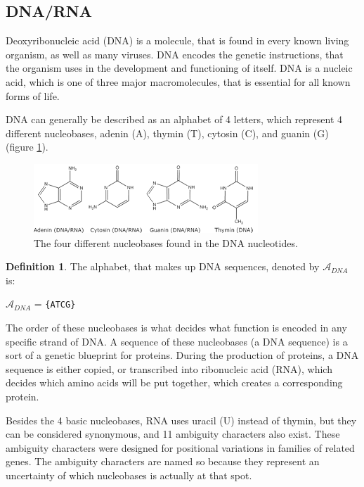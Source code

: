 \documentclass[12pt]{article}
\theoremstyle{definition}
\newtheorem{mydef}{Definition}
\begin{document}
\subsection{DNA/RNA}

Deoxyribonucleic acid (DNA) is a molecule, that is found in every known living organism, as well as many viruses. DNA encodes the genetic instructions, that the organism uses in the development and functioning of itself. DNA is a nucleic acid, which is one of three major macromolecules, that is essential for all known forms of life.

DNA can generally be described as an alphabet of 4 letters, which represent 4 different nucleobases, adenin (A), thymin (T), cytosin (C), and guanin (G) (figure \ref{dnabases}).

\begin{figure}[H]
\label{dnabases}
\begin{center}
	\includegraphics[scale=4]{dnabaserne.png}
\end{center}
\caption{The four different nucleobases found in the DNA nucleotides.\cite{DNA-biotechacademy}}
\end{figure}

\begin{mydef}
The alphabet, that makes up DNA sequences, denoted by $\mathcal{A}_{DNA}$ is:
\begin{center}
$\mathcal{A}_{DNA}$ = \texttt{\{ATCG\}}
\end{center}
\end{mydef}

The order of these nucleobases is what decides what function is encoded in any specific strand of DNA. A sequence of these nucleobases (a DNA sequence) is a sort of a genetic blueprint for proteins. During the production of proteins, a DNA sequence is either copied, or transcribed into ribonucleic acid (RNA), which decides which amino acids will be put together, which creates a corresponding protein.

Besides the 4 basic nucleobases, RNA uses uracil (U) instead of thymin, but they can be considered synonymous, and 11 ambiguity characters also exist.\cite{DNA-sciencedaily} These ambiguity characters were designed for positional variations in families of related genes. The ambiguity characters are named so because they represent  an uncertainty of which nucleobases is actually at that spot.
\end{document}
